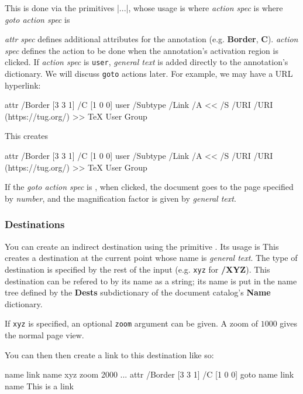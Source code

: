 This is done via the primitives \inlinecode|\pdfstartlink...\pdfendlink|, whose usage is
\noindent where {\it action spec} is
\noindent where {\it goto action spec} is

{\it attr spec} defines additional attributes for the annotation (e.g. {\bf Border}, {\bf C}).
{\it action spec} defines the action to be done when the annotation's activation region is clicked.
If {\it action spec} is {\tt user}, {\it general text} is added directly to the annotation's dictionary.
We will discuss {\tt goto} actions later.
For example, we may have a URL hyperlink:

\blisting
\pdfstartlink
    attr {
        /Border [3 3 1]
        /C [1 0 0]
    }
    user {
        /Subtype /Link
        /A <<
            /S /URI
            /URI (https://tug.org/)
        >>
    }
\TeX{} User Group%
\pdfendlink
\elisting

This creates

\centerline{%
\pdfstartlink
    attr {
        /Border [3 3 1]
        /C [1 0 0]
    }
    user {
        /Subtype /Link
        /A <<
            /S /URI
            /URI (https://tug.org/)
        >>
    }
\TeX{} User Group%
\pdfendlink}

If the {\it goto action spec} is , when clicked, the document goes to the page
specified by {\it number}, and the magnification factor is given by {\it general text}.

\subsubsection{Destinations}

You can create an indirect destination using the primitive \macro\pdfdest.
Its usage is
\noindent This creates a destination at the current point whose name is {\it general text}.
The type of destination is specified by the rest of the input (e.g. {\tt xyz} for {\bf/XYZ}).
This destination can be refered to by its name as a string; its name is put in the name tree defined by
the {\bf Dests} subdictionary of the document catalog's {\bf Name} dictionary.

If {\tt xyz} is specified, an optional {\tt zoom} argument can be given.
A zoom of $1000$ gives the normal page view.

You can then then create a link to this destination like so:

\blisting
\pdfdest name {link name} xyz zoom 2000
...
\pdfstartlink
    attr {
        /Border [3 3 1]
        /C [1 0 0]
    }
    goto name {link name}%
This is a link%
\pdfendlink
\elisting

